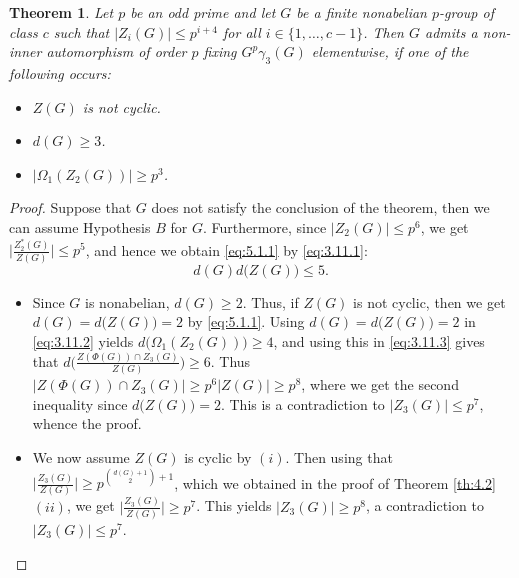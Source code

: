 \documentclass[preprint,sort&compress,12pt]{elsarticle}
\newtheorem{theorem}{Theorem}[section]
\theoremstyle{definition}
\numberwithin{equation}{theorem}
\begin{document}
\begin{theorem}\label{th:5.1}
Let $p$ be an odd prime and let $G$ be a finite nonabelian $p$-group of class $c$ such that $|Z_i(G)|\le p^{i+4}$ for all $i\in \{1, \ldots, c-1\}$. Then $G$ admits a non-inner automorphism of order $p$ fixing $G^p\gamma_3(G)$ elementwise, if one of the following occurs:
\begin{itemize}
\item [$(i)$] $Z(G)$ is not cyclic.
\item [$(ii)$] $d(G)\ge 3$.
\item [$(iii)$] $|\Omega_1(Z_2(G))|\ge p^3$.
\end{itemize}
\end{theorem}

\begin{proof}
Suppose that $G$ does not satisfy the conclusion of the theorem, then we can assume Hypothesis $B$ for $G$. Furthermore, since $|Z_2(G)|\le p^6$, we get $\bigg|\frac{Z_2^*(G)}{Z(G)}\bigg|\le p^5$, and hence we obtain \eqref{eq:5.1.1} by \eqref{eq:3.11.1}: 
\begin{equation}\label{eq:5.1.1}
d(G)d\big(Z(G)\big)\le 5.
\end{equation}
\begin{itemize}
\item [$(i)$] Since $G$ is nonabelian, $d(G)\ge 2$. Thus, if $Z(G)$ is not cyclic, then we get $d(G)= d\big(Z(G)\big)= 2$ by \eqref{eq:5.1.1}. Using $d(G)=d\big(Z(G)\big)=2$ in \eqref{eq:3.11.2} yields $d\big(\Omega_1(Z_2(G))\big)\ge 4$, and using this in \eqref{eq:3.11.3} gives that $d\bigg(\frac{Z(\Phi(G))\cap Z_3(G)}{Z(G)}\bigg)\ge 6$. Thus $|Z( \Phi(G))\cap Z_3(G)|\ge p^6|Z(G)|\ge p^8$, where we get the second inequality since $d\big(Z(G)\big)=2$. This is a contradiction to $|Z_3(G)|\le p^7$, whence the proof.

\item [$(ii)$] We now assume $Z(G)$ is cyclic by $(i)$. Then using that $\bigg|\frac{Z_3(G)}{Z(G)}\bigg|\ge p^{{{d(G)+1}\choose{2}}+1}$, which we obtained in the proof of Theorem \ref{th:4.2} $(ii)$, we get $\bigg|\frac{Z_3(G)}{Z(G)}\bigg|\ge p^7$. This yields $|Z_3(G)|\ge p^8$, a contradiction to $|Z_3(G)|\le p^7$.


\end{itemize}
\end{proof}
\end{document}
